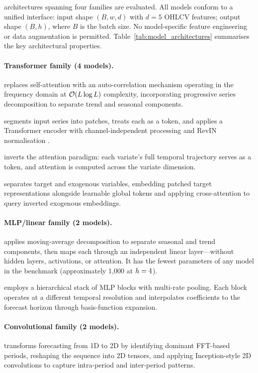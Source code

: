 \Nmodels architectures spanning four families are evaluated.  All models conform to a unified interface: input shape $(B, w, d)$ with $d = 5$ OHLCV features; output shape $(B, h)$, where $B$ is the batch size.  No model-specific feature engineering or data augmentation is permitted.  Table~\ref{tab:model_architectures} summarises the key architectural properties.

\paragraph{Transformer family (4 models).}
\autoformer \citep{Wu2021} replaces self-attention with an auto-correlation mechanism operating in the frequency domain at $\mathcal{O}(L \log L)$ complexity, incorporating progressive series decomposition to separate trend and seasonal components.

\patchtst \citep{Nie2023} segments input series into patches, treats each as a token, and applies a Transformer encoder with channel-independent processing and RevIN normalisation \citep{Kim2022}.

\itransformer \citep{Liu2024itransformer} inverts the attention paradigm: each variate's full temporal trajectory serves as a token, and attention is computed across the variate dimension.

\timexer \citep{Wang2024timexer} separates target and exogenous variables, embedding patched target representations alongside learnable global tokens and applying cross-attention to query inverted exogenous embeddings.

\paragraph{MLP/linear family (2 models).}
\dlinear \citep{Zeng2023} applies moving-average decomposition to separate seasonal and trend components, then maps each through an independent linear layer---without hidden layers, activations, or attention.  It has the fewest parameters of any model in the benchmark (approximately 1{,}000 at $h=4$).

\nhits \citep{Challu2023} employs a hierarchical stack of MLP blocks with multi-rate pooling.  Each block operates at a different temporal resolution and interpolates coefficients to the forecast horizon through basis-function expansion.

\paragraph{Convolutional family (2 models).}
\timesnet \citep{Wu2023timesnet} transforms forecasting from 1D to 2D by identifying dominant FFT-based periods, reshaping the sequence into 2D tensors, and applying Inception-style 2D convolutions to capture intra-period and inter-period patterns.

